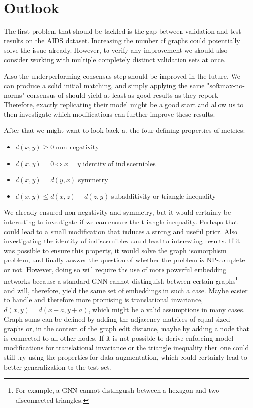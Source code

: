 \section{Outlook}

The first problem that should be tackled is the gap between validation and test results on the AIDS dataset. Increasing the number of graphs could potentially solve the issue already. However, to verify any improvement we should also consider working with multiple completely distinct validation sets at once.

Also the underperforming consensus step should be improved in the future. We can produce a solid initial matching, and simply applying the same "softmax-no-norms" consensus of \cite{fey2020_update} should yield at least as good results as they report. Therefore, exactly replicating their model might be a good start and allow us to then investigate which modifications can further improve these results.

After that we might want to look back at the four defining properties of metrics:
\begin{itemize}
    \itemsep0em
    \item $d(x,y) \ge 0$ non-negativity
    \item $d(x,y) = 0 \Leftrightarrow x = y$ identity of indiscernibles
    \item $d(x,y)  = d(y,x)$ symmetry
    \item $d(x,y) \le d(x,z) + d(z, y)$ subadditivity or triangle inequality
\end{itemize}
We already ensured non-negativity and symmetry, but it would certainly be interesting to investigate if we can ensure the triangle inequality. Perhaps that could lead to a small modification that induces a strong and useful prior. Also investigating the identity of indiscernibles could lead to interesting results. If it was possible to ensure this property, it would solve the graph isomorphism problem, and finally answer the question of whether the problem is NP-complete or not. However, doing so will require the use of more powerful embedding networks because a standard GNN cannot distinguish between certain graphs\footnote{For example, a GNN cannot distinguish between a hexagon and two disconnected triangles.} and will, therefore, yield the same set of embeddings in such a case. Maybe easier to handle and therefore more promising is translational invariance, $d(x,y) = d(x+a,y+a)$, which might be a valid assumptions in many cases. Graph sums can be defined by adding the adjacency matrices of equal-sized graphs \cite{graph_sum2004} or, in the context of the graph edit distance, maybe by adding a node that is connected to all other nodes. If it is not possible to derive enforcing model modifications for translational invariance or the triangle inequality then one could still try using the properties for data augmentation, which could certainly lead to better generalization to the test set.

